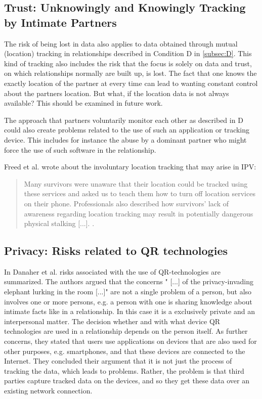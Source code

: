 \subsection{Trust: Unknowingly and Knowingly Tracking by Intimate Partners}
The risk of being lost in data also applies to data obtained through mutual (location) tracking in relationships described in Condition D in \ref{subsec:D}. This kind of tracking also includes the risk that the focus is solely on data and trust, on which relationships normally are built up, is lost. The fact that one knows the exactly location of the partner at every time can lead to wanting constant control about the partners location. But what, if the location data is not always available? This should be examined in future work.


The approach that partners voluntarily monitor each other as described in D could also create problems related to the use of such an application or tracking device.
This includes for instance the abuse by a dominant partner who might force the use of such software in the relationship.

Freed et al. \cite{freed2018stalker} wrote about the involuntary location tracking that may arise in \acs{IPV}:
\begin{quote}
Many survivors were unaware that their location could be tracked using these services and asked us to teach them how to turn off location services on their phone. Professionals also described how survivors' lack of awareness regarding location tracking may result in potentially dangerous physical stalking [...]. \cite{freed2018stalker}.
\end{quote}


\subsection{Privacy: Risks related to \acs{QR} technologies}
In Danaher et al. \cite{doi:10.1080/15265161.2017.1422294}  risks associated with the use of \acs{QR}-technologies are summarized.
The authors argued that the concerns " [...] of the privacy-invading elephant lurking in the room [...]" are not  a single problem of a person, but also involves one or more persons, e.g. a person with one is sharing knowledge about intimate facts like in a relationship. In this case it is a exclusively private and an interpersonal matter. The decision whether and with what device \acs{QR} technologies are used in a relationship depends on the person itself.
As further concerns, they stated that users use applications on devices that are also used for other purposes, e.g. smartphones, and that these devices are connected to the Internet. 
They concluded their argument that it is not just the process of tracking the data, which leads to problems. Rather, the problem is that third parties capture tracked data on the devices, and so they get these data over an existing network connection.

